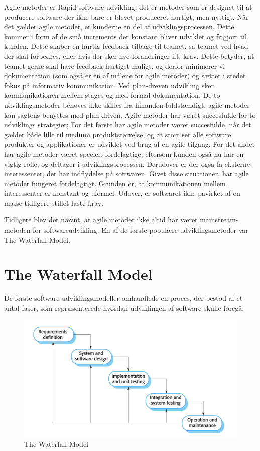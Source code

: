 Agile metoder er Rapid software udvikling, det er metoder som er designet til at producere software der ikke bare er blevet produceret hurtigt, men nyttigt\cite{Sommerville}.  Når det gælder agile metoder, er kunderne en del af udviklingsprocessen. Dette kommer i form af de små increments der konstant bliver udviklet og frigjort til kunden. Dette skaber en hurtig feedback tilbage til teamet, så teamet ved hvad der skal forbedres, eller hvis der sker nye forandringer ift. krav. Dette betyder, at teamet gerne skal have feedback hurtigst muligt, og derfor minimerer vi dokumentation (som også er en af målene for agile metoder) og sætter i stedet fokus på informativ kommunikation. Ved plan-dreven udvikling sker kommunikationen mellem stages og med formal dokumentation. De to udviklingsmetoder behøves ikke skilles fra hinanden fuldstændigt, agile metoder kan sagtens benyttes med plan-driven. Agile metoder har været succesfulde for to udviklings strategier;
For det første har agile metoder været succesfulde, når det gælder både lille til medium produktstørrelse, og at stort set alle software produkter og applikationer er udviklet ved brug af en agile tilgang.
For det andet har agile metoder været specielt fordelagtige, eftersom kunden også nu har en vigtig rolle, og deltager i udviklingsprocessen. Derudover er der også få eksterne interessenter, der har indflydelse på softwaren\cite{Sommerville}. 
Givet disse situationer, har agile metoder fungeret fordelagtigt. Grunden er, at kommunikationen mellem interessenter er konstant og uformel. Udover, er softwaret ikke påvirket af en masse tidligere stillet faste krav.

Tidligere blev det nævnt, at agile metoder ikke altid har været mainstream-metoden for softwareudvikling. En af de første populære udviklingsmetoder var The Waterfall Model.

\section{The Waterfall Model}
De første software udviklingsmodeller omhandlede en proces, der bestod af et antal faser, som repræsenterede hvordan udviklingen af software skulle foregå\cite{Sommerville}. 

\begin{figure}
    \includegraphics[width=\linewidth]{figures/waterfall_model.png}
    \caption{The Waterfall Model}
    \label{fig:waterfall}
\end{figure}

